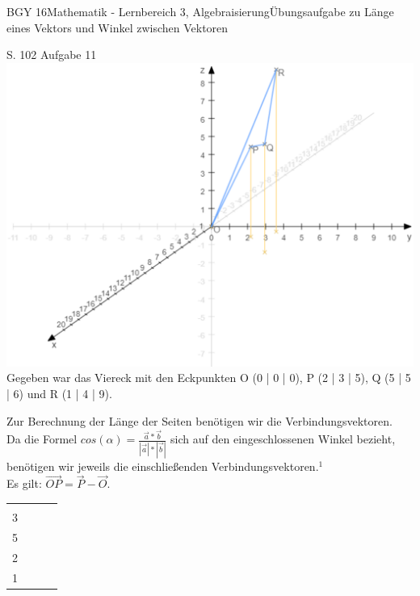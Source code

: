 \documentclass[oneside,openany,headings=optiontotoc,11pt,numbers=noenddot]{scrreprt}
\begin{document}
	\begin{worksheet}{BGY 16}{Mathematik - Lernbereich 3, Algebraisierung}{Übungsaufgabe zu Länge eines Vektors und Winkel zwischen Vektoren}
		
		\begin{framed}
			\noindent
			\tiny{\color{codegray}S. 102 Aufgabe 11}\\
			\normalsize
			\noindent
			\includegraphics[scale=0.75]{Bilder/S102N11.png}\\
			Gegeben war das Viereck mit den Eckpunkten O (0 | 0 | 0), P (2 | 3 | 5), Q (5 | 5 | 6) und R (1 | 4 | 9).\\
			\par\noindent
			Zur Berechnung der Länge der Seiten benötigen wir die Verbindungsvektoren.\\
			Da die Formel \(cos{(\alpha)} = \frac{\vec{a}*\vec{b}}{|\vec{a}|*|\vec{b}|}\) sich auf den eingeschlossenen Winkel bezieht, benötigen wir jeweils die einschließenden Verbindungsvektoren.\(^{1}\)\\
			\tiny{\color{codegray}Es gilt: \(\vec{OP} = \vec{P}-\vec{O}\).}\\
			\normalsize
			\par\noindent
			\begin{tabularx}{\textwidth}{XXXX}
				\(\vec{OP} = \left(\begin{array}{c}2 \\ 3 \\5\end{array}\right)\) &
				\(\vec{PQ} =\left(\begin{array}{c}3\\2\\1\end{array}\right)\) &

\end{tabularx}
\end{framed}
\end{worksheet}
\end{document}
